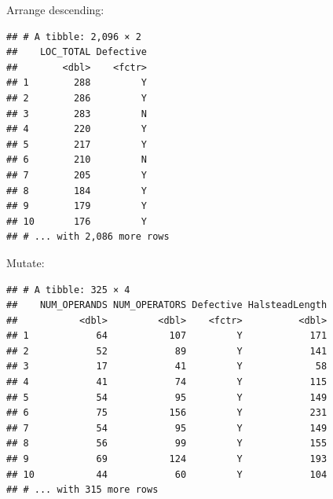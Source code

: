\documentclass[]{book}
\newenvironment{Shaded}{\begin{snugshade}}{\end{snugshade}}
\newcommand{\KeywordTok}[1]{\textcolor[rgb]{0.13,0.29,0.53}{\textbf{{#1}}}}
\newcommand{\DataTypeTok}[1]{\textcolor[rgb]{0.13,0.29,0.53}{{#1}}}
\newcommand{\StringTok}[1]{\textcolor[rgb]{0.31,0.60,0.02}{{#1}}}
\newcommand{\NormalTok}[1]{{#1}}
\begin{document}
Arrange descending:

\begin{Shaded}
\end{Shaded}

\begin{verbatim}
## # A tibble: 2,096 × 2
##    LOC_TOTAL Defective
##        <dbl>    <fctr>
## 1        288         Y
## 2        286         Y
## 3        283         N
## 4        220         Y
## 5        217         Y
## 6        210         N
## 7        205         Y
## 8        184         Y
## 9        179         Y
## 10       176         Y
## # ... with 2,086 more rows
\end{verbatim}

Mutate:

\begin{Shaded}
\end{Shaded}

\begin{verbatim}
## # A tibble: 325 × 4
##    NUM_OPERANDS NUM_OPERATORS Defective HalsteadLength
##           <dbl>         <dbl>    <fctr>          <dbl>
## 1            64           107         Y            171
## 2            52            89         Y            141
## 3            17            41         Y             58
## 4            41            74         Y            115
## 5            54            95         Y            149
## 6            75           156         Y            231
## 7            54            95         Y            149
## 8            56            99         Y            155
## 9            69           124         Y            193
## 10           44            60         Y            104
## # ... with 315 more rows
\end{verbatim}
\end{document}
